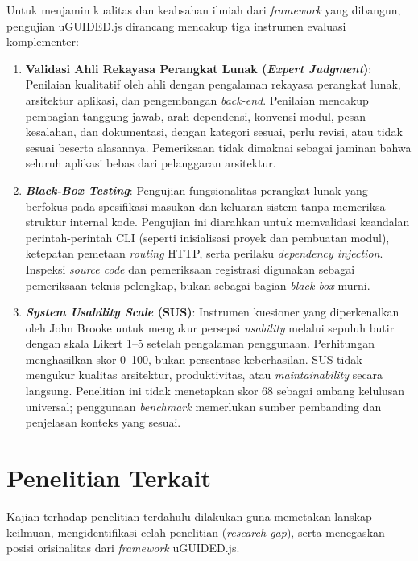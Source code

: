\documentclass[12pt,a4paper,oneside]{report}
\begin{document}
Untuk menjamin kualitas dan keabsahan ilmiah dari \textit{framework} yang dibangun, pengujian uGUIDED.js dirancang mencakup tiga instrumen evaluasi komplementer:
\begin{enumerate}
    \item \textbf{Validasi Ahli Rekayasa Perangkat Lunak (\textit{Expert Judgment})}:
    Penilaian kualitatif oleh ahli dengan pengalaman rekayasa perangkat lunak, arsitektur aplikasi, dan pengembangan \textit{back-end}. Penilaian mencakup pembagian tanggung jawab, arah dependensi, konvensi modul, pesan kesalahan, dan dokumentasi, dengan kategori sesuai, perlu revisi, atau tidak sesuai beserta alasannya. Pemeriksaan tidak dimaknai sebagai jaminan bahwa seluruh aplikasi bebas dari pelanggaran arsitektur.
    
    \item \textbf{\textit{Black-Box Testing}}:
    Pengujian fungsionalitas perangkat lunak yang berfokus pada spesifikasi masukan dan keluaran sistem tanpa memeriksa struktur internal kode. Pengujian ini diarahkan untuk memvalidasi keandalan perintah-perintah CLI (seperti inisialisasi proyek dan pembuatan modul), ketepatan pemetaan \textit{routing} HTTP, serta perilaku \textit{dependency injection}. Inspeksi \textit{source code} dan pemeriksaan registrasi digunakan sebagai pemeriksaan teknis pelengkap, bukan sebagai bagian \textit{black-box} murni.
    
    \item \textbf{\textit{System Usability Scale} (SUS)}:
    Instrumen kuesioner yang diperkenalkan oleh John Brooke \cite{brooke1996sus} untuk mengukur persepsi \textit{usability} melalui sepuluh butir dengan skala Likert 1--5 setelah pengalaman penggunaan. Perhitungan menghasilkan skor 0--100, bukan persentase keberhasilan. SUS tidak mengukur kualitas arsitektur, produktivitas, atau \textit{maintainability} secara langsung. Penelitian ini tidak menetapkan skor 68 sebagai ambang kelulusan universal; penggunaan \textit{benchmark} memerlukan sumber pembanding dan penjelasan konteks yang sesuai.
\end{enumerate}

\section{Penelitian Terkait}
\label{sec:penelitian_terkait}

Kajian terhadap penelitian terdahulu dilakukan guna memetakan lanskap keilmuan, mengidentifikasi celah penelitian (\textit{research gap}), serta menegaskan posisi orisinalitas dari \textit{framework} uGUIDED.js.
\end{document}
